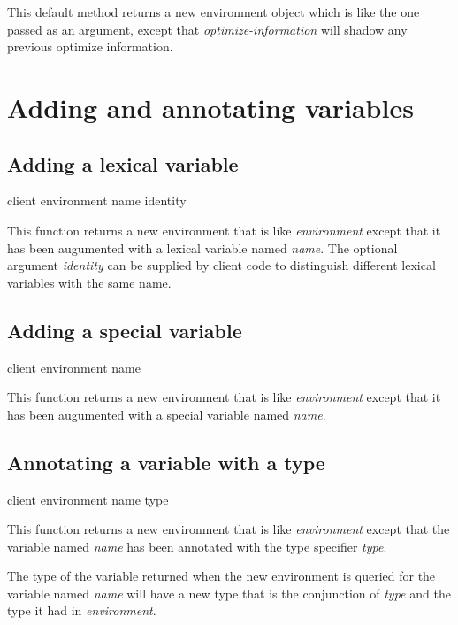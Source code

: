 This default method returns a new environment object which is like the
one passed as an argument, except that \textit{optimize-information}
will shadow any previous optimize information.

\section{Adding and annotating variables}

\subsection{Adding a lexical variable}

{\footnotesize
{} {client environment name \optional identity}
}

This function returns a new environment that is like
\textit{environment} except that it has been augumented with a lexical
variable named \textit{name}.  The optional argument \textit{identity}
can be supplied by client code to distinguish different lexical
variables with the same name.

\subsection{Adding a special variable}

{\footnotesize
{} {client environment name}
}

This function returns a new environment that is like
\textit{environment} except that it has been augumented with a special
variable named \textit{name}.

\subsection{Annotating a variable with a type}
\label{sec-annotating-a-variable-with-a-type}

{\footnotesize
{} {client environment name type}
}

This function returns a new environment that is like
\textit{environment} except that the variable named \textit{name} has
been annotated with the type specifier \textit{type}.

The type of the variable returned when the new environment is queried
for the variable named \textit{name} will have a new type that is the
conjunction of \textit{type} and the type it had in
\textit{environment}.

